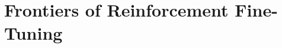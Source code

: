 \setcounter{chapter}{20}

\hypertarget{frontiers-of-reinforcement-fine-tuning}{%
\chapter{Frontiers of Reinforcement Fine-Tuning}\label{frontiers-of-reinforcement-fine-tuning}}

